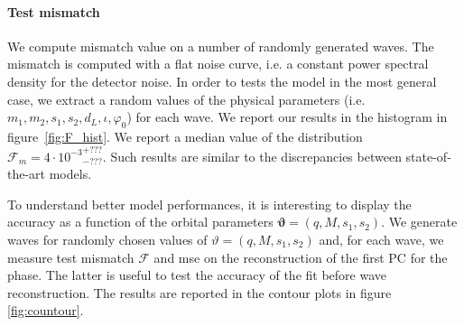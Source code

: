 \paragraph{Test mismatch}
We compute mismatch value on a number of randomly generated waves.
The mismatch is computed with a flat noise curve, i.e. a constant power spectral density for the detector noise.
In order to tests the model in the most general case, we extract a random values of the physical parameters (i.e. $m_1,m_2, s_1, s_2, d_L, \iota, \varphi_0$) for each wave.
We report our results in the histogram in figure~\ref{fig:F_hist}.
We report a median value of the distribution $\mathcal{F}_m = 4 \cdot {10^{-3}}^{+???}_{-???}$. Such results are similar to the discrepancies between state-of-the-art models.
\par
To understand better model performances, it is interesting to display the accuracy as a function of the orbital parameters $\boldsymbol{\vartheta} = (q,M,s_1,s_2)$.
We generate waves for randomly chosen values of $\vartheta = (q, M, s_1, s_2)$ and, for each wave, we measure test mismatch $\mathcal{F}$ and mse on the reconstruction of the first PC for the phase.
The latter is useful to test the accuracy of the fit before wave reconstruction.
The results are reported in the contour plots in figure \ref{fig:countour}.
\par

